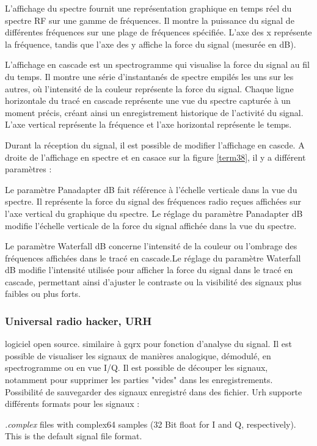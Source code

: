 L'affichage du spectre fournit une représentation graphique en temps réel du spectre RF sur une gamme de fréquences.
Il montre la puissance du signal de différentes fréquences sur une plage de fréquences spécifiée.
L'axe des x représente la fréquence, tandis que l'axe des y affiche la force du signal (mesurée en dB).

L'affichage en cascade est un spectrogramme qui visualise la force du signal au fil du temps.
Il montre une série d'instantanés de spectre empilés les uns sur les autres, où l'intensité de la couleur représente la force du signal.
Chaque ligne horizontale du tracé en cascade représente une vue du spectre capturée à un moment précis, créant ainsi un enregistrement historique de l'activité du signal.
L'axe vertical représente la fréquence et l'axe horizontal représente le temps.

Durant la réception du signal, il est possible de modifier l'affichage en cascde. A droite de l'affichage en spectre et en casace sur la figure \ref{term38}, il y a différent paramètres :

Le paramètre Panadapter dB fait référence à l'échelle verticale dans la vue du spectre. Il représente la force du signal des fréquences radio reçues affichées sur l'axe vertical du graphique du spectre. Le réglage du paramètre Panadapter dB modifie l’échelle verticale de la force du signal affichée dans la vue du spectre.

Le paramètre Waterfall dB concerne l'intensité de la couleur ou l'ombrage des fréquences affichées dans le tracé en cascade.Le réglage du paramètre Waterfall dB modifie l'intensité utilisée pour afficher la force du signal dans le tracé en cascade, permettant ainsi d'ajuster le contraste ou la visibilité des signaux plus faibles ou plus forts.


\subsubsection{Universal radio hacker, URH}

logiciel open source. similaire à gqrx pour fonction d'analyse du signal. Il est possible de visualiser les signaux de manières analogique, démodulé, en spectrogramme ou en vue I/Q. Il est possible de découper les signaux, notamment pour supprimer les parties "vides" dans les enregistrements. Possibilité de sauvegarder des signaux enregistré dans des fichier. Urh supporte différents formats pour les signaux :

 \textit{.complex} files with complex64 samples (32 Bit float for I and Q, respectively). This is the default signal file format.
 
